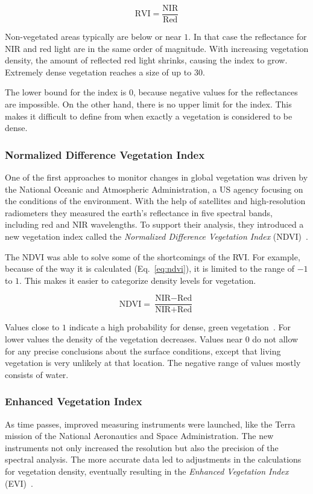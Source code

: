 \begin{equation}
    \text{RVI} = \frac{\text{NIR}}{\text{Red}}
    \label{eq:rvi}
\end{equation}

Non-vegetated areas typically are below or near $1$. In that case the reflectance for NIR and red light are in the same order of magnitude. With increasing vegetation density, the amount of reflected red light shrinks, causing the index to grow. Extremely dense vegetation reaches a size of up to $30$.

The lower bound for the index is $0$, because negative values for the reflectances are impossible. On the other hand, there is no upper limit for the index. This makes it difficult to define from when exactly a vegetation is considered to be dense.

\subsubsection{Normalized Difference Vegetation Index}
One of the first approaches to monitor changes in global vegetation was driven by the National Oceanic and Atmospheric Administration, a US agency focusing on the conditions of the environment. With the help of satellites and high-resolution radiometers they measured the earth's reflectance in five spectral bands, including red and NIR wavelengths. To support their analysis, they introduced a new vegetation index called the \emph{Normalized Difference Vegetation Index} (NDVI)~\cite{measuring_vegetation00}.

The NDVI was able to solve some of the shortcomings of the RVI. For example, because of the way it is calculated (Eq.~\ref{eq:ndvi}), it is limited to the range of $-1$ to $1$. This makes it easier to categorize density levels for vegetation.

\begin{equation}
    \text{NDVI} = \frac{\text{NIR}-\text{Red}}{\text{NIR}+\text{Red}}
    \label{eq:ndvi}
\end{equation}

Values close to $1$ indicate a high probability for dense, green vegetation~\cite{gisg_ndvi20}. For lower values the density of the vegetation decreases. Values near $0$ do not allow for any precise conclusions about the surface conditions, except that living vegetation is very unlikely at that location. The negative range of values mostly consists of water.

\subsubsection{Enhanced Vegetation Index}
As time passes, improved measuring instruments were launched, like the Terra mission of the National Aeronautics and Space Administration. The new instruments not only increased the resolution but also the precision of the spectral analysis. The more accurate data led to adjustments in the calculations for vegetation density, eventually resulting in the \emph{Enhanced Vegetation Index} (EVI)~\cite{modis2002}.
\clearpage

